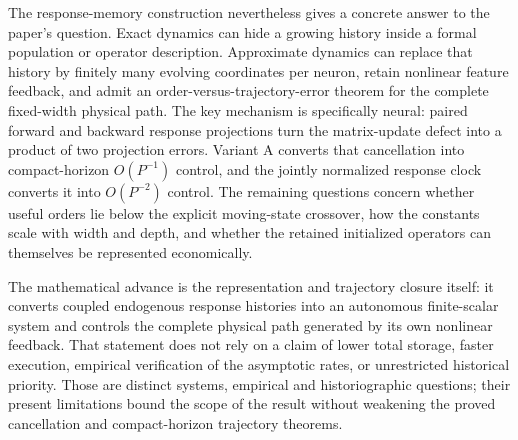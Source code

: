 \documentclass[11pt]{article}
\theoremstyle{definition}
\theoremstyle{remark}
\begin{document}
The response-memory construction nevertheless gives a concrete answer to the
paper's question.  Exact dynamics can hide a growing history inside a formal
population or operator description.  Approximate dynamics can replace that
history by finitely many evolving coordinates per neuron, retain nonlinear
feature feedback, and admit an order-versus-trajectory-error theorem for the
complete fixed-width physical path.  The key mechanism is specifically neural:
paired forward and backward response projections turn the matrix-update defect
into a product of two projection errors.  Variant A converts that cancellation
into compact-horizon $O(P^{-1})$ control, and the jointly normalized response
clock converts it into $O(P^{-2})$ control.  The remaining questions concern
whether useful orders lie below the explicit moving-state crossover, how the
constants scale with width and depth, and whether the retained initialized
operators can themselves be represented economically.

The mathematical advance is the representation and trajectory closure itself:
it converts coupled endogenous response histories into an autonomous
finite-scalar system and controls the complete physical path generated by its
own nonlinear feedback.  That statement does not rely on a claim of lower
total storage, faster execution, empirical verification of the asymptotic
rates, or unrestricted historical priority.  Those are distinct systems,
empirical and historiographic questions; their present limitations bound the
scope of the result without weakening the proved cancellation and
compact-horizon trajectory theorems.



\end{document}

